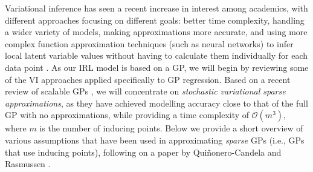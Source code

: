 \documentclass{mprop}
\theoremstyle{definition}
\begin{document}
Variational inference has seen a recent increase in interest among academics,
with different approaches focusing on different goals: better time complexity,
handling a wider variety of models, making approximations more accurate, and
using more complex function approximation techniques (such as neural networks)
to infer local latent variable values without having to calculate them
individually for each data point \cite{DBLP:journals/corr/abs-1711-05597}. As
our IRL model is based on a GP, we will begin by reviewing some of the VI
approaches applied specifically to GP regression. Based on a recent review of
scalable GPs \cite{DBLP:journals/corr/abs-1711-05597}, we will concentrate on
\emph{stochastic variational sparse approximations}, as they have achieved
modelling accuracy close to that of the full GP with no approximations, while
providing a time complexity of $\mathcal{O}(m^3)$, where $m$ is the number of
inducing points. Below we provide a short overview of various assumptions that
have been used in approximating \emph{sparse} GPs (i.e., GPs that use inducing
points), following on a paper by Qui\~{n}onero-Candela and Rasmussen
\cite{DBLP:journals/jmlr/CandelaR05}.
\end{document}
